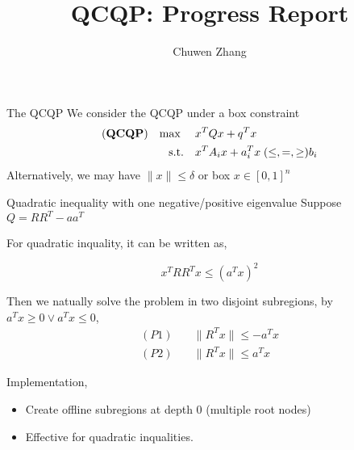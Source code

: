 \documentclass[aspectratio=1610, 10pt]{beamer}
\newcommand{\model}[1]{(\textbf{#1})}
\newcommand{\mx}{\mathbf{\max}\;}
\begin{document}
\title{QCQP: Progress Report}

\author{
  Chuwen Zhang
}


\maketitle
\begin{frame}{The QCQP}
  We consider the QCQP under a box constraint
  \begin{equation}
    \label{eq:inhoqcqp}
    \begin{aligned}
      \model{QCQP} \quad \mx \quad & x^T Qx + q^T x                                        \\
      \textrm{s.t.} \quad          & x^T A_i x + a_i^T x \hspace{0.27em} (\le, =, \ge) b_i \\
    \end{aligned}
  \end{equation}
  Alternatively, we may have \(\|x\| \le \delta\) or box \(x \in [0, 1]^n\)
\end{frame}
\begin{frame}[allowframebreaks]{Quadratic inequality with one negative/positive eigenvalue}
  Suppose \(Q = RR^T - aa^T\)

  For quadratic inquality,  it can be written as,

  \begin{equation*}
    x^TRR^Tx \le (a^Tx)^2
  \end{equation*}

  Then we natually solve the problem in two disjoint subregions, by \(a^Tx \ge 0 \vee  a^Tx \le 0 \),
  \begin{align*}
    (P1) \quad & \|R^Tx\| \le - a^Tx \\
    (P2) \quad & \|R^Tx\| \le a^Tx
  \end{align*}

  Implementation,
  \begin{itemize}
    \item Create offline subregions at depth 0 (multiple root nodes)
    \item Effective for quadratic inqualities.
  \end{itemize}

\end{frame}
\end{document}
